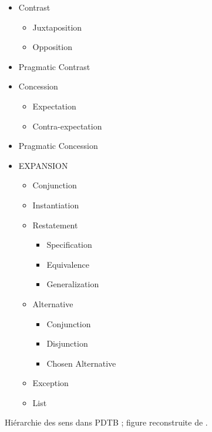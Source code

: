 \documentclass{KodeBook}
\begin{document}
\begin{figure}[!ht]
\begin{minipage}{.3\textwidth}
\begin{itemize}
	\begin{itemize}
		\item Contrast
		\begin{itemize}
			\item Juxtaposition 
			\item Opposition
		\end{itemize}
		\item Pragmatic Contrast
		\item Concession
		\begin{itemize}
			\item Expectation
			\item Contra-expectation
		\end{itemize}
		\item Pragmatic Concession
	\end{itemize}
\end{itemize}
\end{minipage}
\begin{minipage}{.3\textwidth}
	\scriptsize\bfseries
	\begin{itemize}
		\item EXPANSION
		\begin{itemize}
			\item Conjunction
			\item Instantiation
			\item Restatement
			\begin{itemize}
				\item Specification
				\item Equivalence
				\item Generalization
			\end{itemize}
			\item Alternative
			\begin{itemize}
				\item Conjunction
				\item Disjunction
				\item Chosen Alternative
			\end{itemize}
			\item Exception
			\item List
		\end{itemize}
	\end{itemize}
\end{minipage}\vspace{-0.5cm}
	\caption[Hiérarchie des sens dans PDTB]{Hiérarchie des sens dans PDTB ; figure reconstruite de \cite{2008-prasad-al}.}
	\label{fig:pdtb-rel}
\end{figure}
\end{document}
